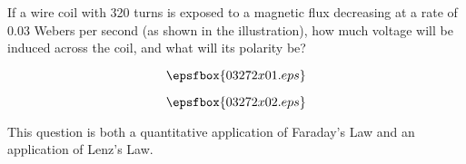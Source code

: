 

If a wire coil with 320 turns is exposed to a magnetic flux decreasing at a rate of 0.03 Webers per second (as shown in the illustration), how much voltage will be induced across the coil, and what will its polarity be?

$$\epsfbox{03272x01.eps}$$







$$\epsfbox{03272x02.eps}$$







This question is both a quantitative application of Faraday's Law and an application of Lenz's Law.




